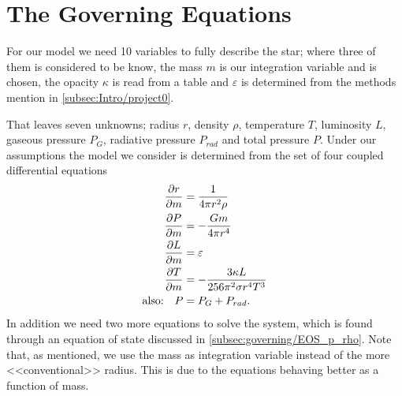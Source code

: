 \documentclass[11pt,a4paper,twocolumn,titlepage]{article}
\begin{document}
\section{The Governing Equations} \label{sec:Governing_equations}
For our model we need 10 variables to fully describe the star; where three of them is considered to be know, the mass $m$ is our integration variable and is chosen, the opacity $\kappa$ is read from a table and $\varepsilon$ is determined from the methods mention in \cref{subsec:Intro/project0}.

That leaves seven unknowns; radius $r$, density $\rho$, temperature $T$, luminosity $L$, gaseous pressure $P_G$, radiative pressure $P_{rad}$ and total pressure ${P}$. Under our assumptions the model we consider is determined from the set of four coupled differential equations
\begin{align}
\pdv{r}{m} &= \frac{1}{4\pi r^2 \rho} \label{eq:dr/dm}
\\
\pdv{P}{m} &= -\frac{Gm}{4\pi r^4} \label{eq:dP/dm} %
\\
\pdv{L}{m} &= \varepsilon    \label{eq:dL/dm}
\\
\pdv{T}{m} &= -\frac{3\kappa L}{256\pi^2\sigma r^4T^3} \label{eq:dT/dm}
\\
\qq*{also:} P &= P_G+P_{rad} \label{eq:Total_pressure}.
\end{align}
In addition we need two more equations to solve the system, which is found through an equation of state discussed in \cref{subsec:governing/EOS_p_rho}. Note that, as mentioned, we use the mass as integration variable instead of the more <<conventional>> radius. This is due to the equations behaving better as a function of mass.

\end{document}
